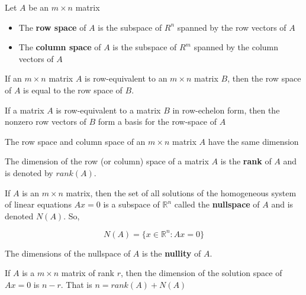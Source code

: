 \documentclass{report}
\begin{document}
\begin{tcolorbox}[title = Definitions of Row Space and Column Space of a Matrix]
	Let $A$ be an $m \times n$ matrix
	\begin{itemize}
			\item The \textbf{row space} of $A$ is the subspace of $R^n$ spanned by the row vectors of $A$
			\item The \textbf{column space} of $A$ is the subspace of $R^m$ spanned by the column vectors of $A$
	\end{itemize}
\end{tcolorbox}

\begin{tcolorbox}[title = Row-Equivalent Matrices Have the Same Row Space]
		If an $m \times n$ matrix $A$ is row-equivalent to an $m \times n$ matrix $B$, then the row space of $A$ is equal to the row space of $B$.
\end{tcolorbox}

\begin{tcolorbox}[title = Basis for the Row Space of a Matrix]
		If a matrix $A$ is row-equivalent to a matrix $B$ in row-echelon form, then the nonzero row vectors of $B$ form a basis for the row-space of $A$
\end{tcolorbox}

\begin{tcolorbox}[title = Row and Column Spaces Have Equal Dimensions]
	The row space and column space of an $m \times n$ matrix $A$ have the same dimension
\end{tcolorbox}

\begin{tcolorbox}[title = Definition of the Rank of a Matrix]
	The dimension of the row (or column) space of a matrix $A$ is the \textbf{rank}	 of  $A$ and is denoted by $rank (A)$.
\end{tcolorbox}

\begin{tcolorbox}[title = Solutions of a Homogenous System]
		If $A$ is an $m \times n$ matrix, then the set of all solutions of the homogeneous system of linear equations $Ax=0$ is a subspace of $\mathbb{R}^n$ called the \textbf{nullspace} of $A$ and is denoted $N(A)$. So,
		
		$$
		N(A) = \{ x \in \mathbb{R}^n: Ax=0\}
		$$
		
		The dimensions of the nullspace of $A$ is the \textbf{nullity} of $A$.
\end{tcolorbox}

\begin{tcolorbox}[title = Dimension of the Solution Space]
		If $A$ is a $m \times n$ matrix of rank $r$, then the dimension of the solution space of $Ax=0$ is $n-r$. That is $n = rank(A) + N(A)$
\end{tcolorbox}
\end{document}
